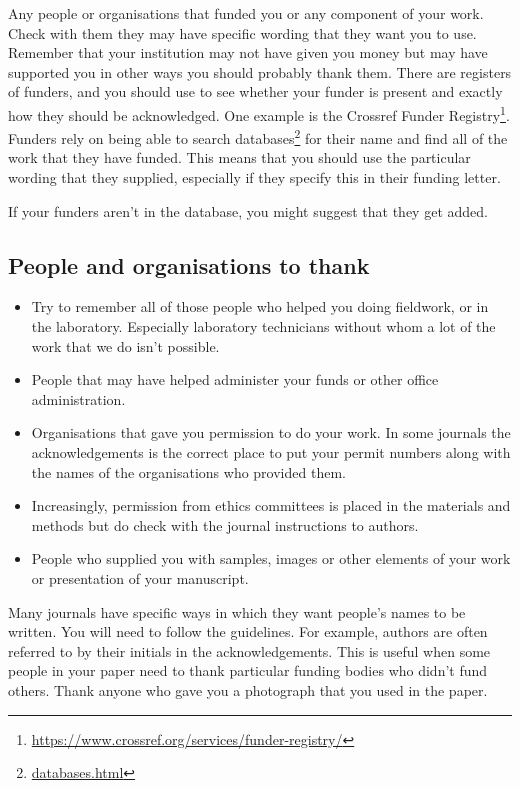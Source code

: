 \documentclass[
]{krantz}
\providecommand{\tightlist}{%
  \setlength{\itemsep}{0pt}\setlength{\parskip}{0pt}}
\renewcommand{\href}[2]{#2\footnote{\url{#1}}}
\begin{document}
Any people or organisations that funded you or any component of your work. Check with them they may have specific wording that they want you to use. Remember that your institution may not have given you money but may have supported you in other ways you should probably thank them. There are registers of funders, and you should use to see whether your funder is present and exactly how they should be acknowledged. One example is the \href{https://www.crossref.org/services/funder-registry/}{Crossref Funder Registry}. Funders rely on being able to search \href{databases.html}{databases} for their name and find all of the work that they have funded. This means that you should use the particular wording that they supplied, especially if they specify this in their funding letter.

If your funders aren't in the database, you might suggest that they get added.

\hypertarget{people-and-organisations-to-thank}{%
\subsection{People and organisations to thank}\label{people-and-organisations-to-thank}}

\begin{itemize}
\tightlist
\item
  Try to remember all of those people who helped you doing fieldwork, or in the laboratory. Especially laboratory technicians without whom a lot of the work that we do isn't possible.
\item
  People that may have helped administer your funds or other office administration.
\item
  Organisations that gave you permission to do your work. In some journals the acknowledgements is the correct place to put your permit numbers along with the names of the organisations who provided them.
\item
  Increasingly, permission from ethics committees is placed in the materials and methods but do check with the journal instructions to authors.
\item
  People who supplied you with samples, images or other elements of your work or presentation of your manuscript.
\end{itemize}

Many journals have specific ways in which they want people's names to be written. You will need to follow the guidelines. For example, authors are often referred to by their initials in the acknowledgements. This is useful when some people in your paper need to thank particular funding bodies who didn't fund others.
Thank anyone who gave you a photograph that you used in the paper.
\end{document}
